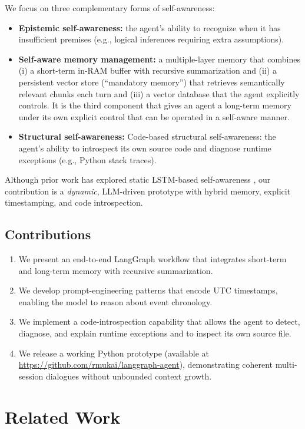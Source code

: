 \documentclass[11pt]{article}
\begin{document}
We focus on three complementary forms of self-awareness:
\begin{itemize}[leftmargin=*]
  \item \textbf{Epistemic self-awareness:} the agent’s ability to recognize when it has insufficient premises (e.g., logical inferences requiring extra assumptions).
  \item \textbf{Self-aware memory management:} a multiple-layer memory that combines (i) a short-term in-RAM buffer with recursive summarization and (ii) a persistent vector store (“mandatory memory”) that retrieves semantically relevant chunks each turn and (iii) a vector database that the agent explicitly controls.  It is the third component that gives an agent a long-term memory under its own explicit control that can be operated in a self-aware manner.
  \item \textbf{Structural self-awareness:}  
 {Code-based structural self-awareness:} the agent’s ability to introspect its own source code and diagnose runtime exceptions (e.g., Python stack traces).
\end{itemize}

Although prior work has explored static LSTM-based self-awareness \cite{Mukai2020}, our contribution is a \emph{dynamic}, LLM-driven prototype with hybrid memory, explicit timestamping, and code introspection.

\subsection{Contributions}
\begin{enumerate}[leftmargin=*]
  \item We present an end-to-end LangGraph workflow that integrates short-term and long-term memory with recursive summarization.
  \item We develop prompt-engineering patterns that encode UTC timestamps, enabling the model to reason about event chronology.
  \item We implement a code-introspection capability that allows the agent to detect, diagnose, and explain runtime exceptions and to inspect its own source file.
  \item We release a working Python prototype (available at \url{https://github.com/rmukai/langgraph-agent}), demonstrating coherent multi-session dialogues without unbounded context growth.
\end{enumerate}

\section{Related Work}
\end{document}
